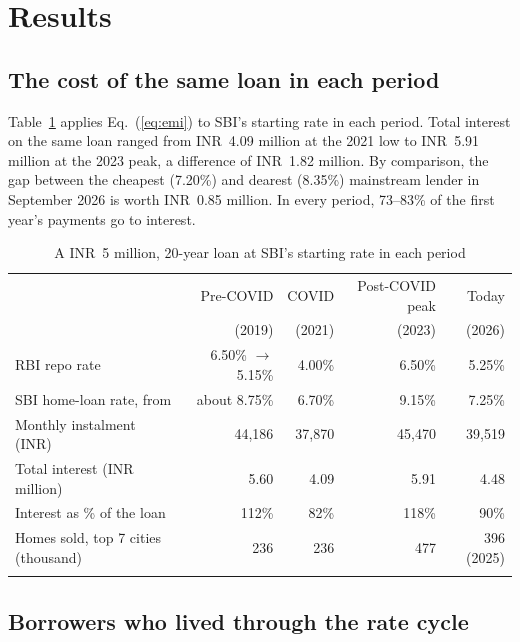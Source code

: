 \documentclass[sn-basic]{sn-jnl}
\newcommand{\INR}{INR~}
\begin{document}
\section{Results}\label{sec:results}

\subsection{The cost of the same loan in each period}

Table~\ref{tab:eras} applies Eq.~(\ref{eq:emi}) to SBI's starting rate in each period. Total interest on the same loan ranged from \INR 4.09 million at the 2021 low to \INR 5.91 million at the 2023 peak, a difference of \INR 1.82 million. By comparison, the gap between the cheapest (7.20\%) and dearest (8.35\%) mainstream lender in September 2026 is worth \INR 0.85 million. In every period, 73--83\% of the first year's payments go to interest.

\begin{table}[h]
\caption{A \INR 5 million, 20-year loan at SBI's starting rate in each period}\label{tab:eras}
\footnotesize
\begin{tabular}{@{}lrrrr@{}}
\toprule
 & Pre-COVID & COVID & Post-COVID peak & Today \\
 & (2019) & (2021) & (2023) & (2026) \\
\midrule
RBI repo rate & 6.50\% $\to$ 5.15\% & 4.00\% & 6.50\% & 5.25\% \\
SBI home-loan rate, from & about 8.75\% & 6.70\% & 9.15\% & 7.25\% \\
Monthly instalment (INR) & 44,186 & 37,870 & 45,470 & 39,519 \\
Total interest (INR million) & 5.60 & 4.09 & 5.91 & 4.48 \\
Interest as \% of the loan & 112\% & 82\% & 118\% & 90\% \\
Homes sold, top 7 cities (thousand) & 236 & 236 & 477 & 396 (2025) \\
\botrule
\end{tabular}
\end{table}

\subsection{Borrowers who lived through the rate cycle}
\end{document}
